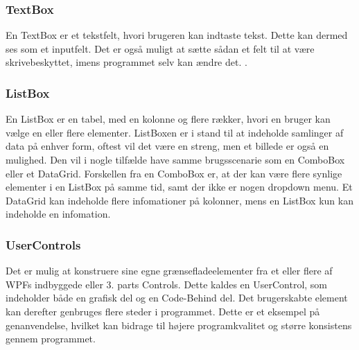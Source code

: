 \subsubsection*{TextBox}
En TextBox er et tekstfelt, hvori brugeren kan indtaste tekst. 
Dette kan dermed ses som et inputfelt. 
Det er også muligt at sætte sådan et felt til at være skrivebeskyttet, imens programmet selv kan ændre det. .

\subsubsection*{ListBox}
En ListBox er en tabel, med en kolonne og flere rækker, hvori en bruger kan vælge en eller flere elementer.
ListBoxen er i stand til at indeholde samlinger af data på enhver form, oftest vil det være en streng, men et billede er også en mulighed.
Den vil i nogle tilfælde have samme brugsscenarie som en ComboBox eller et DataGrid. 
Forskellen fra en ComboBox er, at der kan være flere synlige elementer i en ListBox på samme tid, samt der ikke er nogen dropdown menu.
Et DataGrid kan indeholde flere infomationer på kolonner, mens en ListBox kun kan indeholde en infomation.

\subsubsection*{UserControls}
Det er mulig at konstruere sine egne grænsefladeelementer fra et eller flere af WPFs indbyggede eller 3. parts Controls.
Dette kaldes en UserControl, som indeholder både en grafisk del og en Code-Behind del.
Det brugerskabte element kan derefter genbruges flere steder i programmet.
Dette er et eksempel på genanvendelse, hvilket kan bidrage til højere programkvalitet og større konsistens gennem programmet. 
